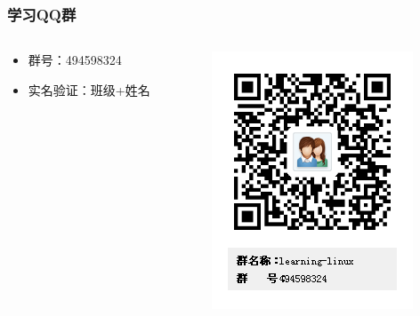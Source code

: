 \documentclass[xcolor=svgnames,presentation]{beamer}
\begin{document}
\begin{frame}
\frametitle{学习QQ群}
\label{sec-4-4-5}
\begin{columns}
\begin{column}{0.5\textwidth}
\label{sec-4-4-5-1}

\begin{itemize}
\item 群号：494598324
\item 实名验证：班级+姓名
\end{itemize}
\end{column}
\begin{column}{0.5\textwidth}
\label{sec-4-4-5-2}

\includegraphics[width=.9\linewidth]{img/learning-linux.png}
\end{column}
\end{columns}
\end{frame}
\end{document}
